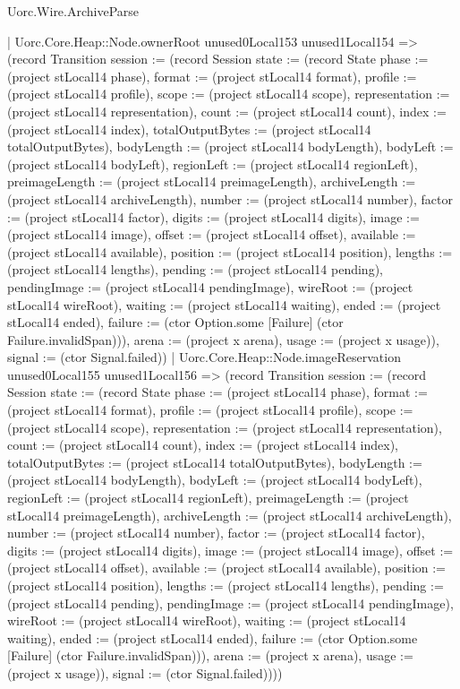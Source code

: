 \begin{lexlean}{Uorc.Wire.ArchiveParse}
\begin{semanticmodule}
{            | Uorc.Core.Heap::Node.ownerRoot unused0Local153 unused1Local154 => (record Transition {session := (record Session {state := (record State {phase := (project stLocal14 phase), format := (project stLocal14 format), profile := (project stLocal14 profile), scope := (project stLocal14 scope), representation := (project stLocal14 representation), count := (project stLocal14 count), index := (project stLocal14 index), totalOutputBytes := (project stLocal14 totalOutputBytes), bodyLength := (project stLocal14 bodyLength), bodyLeft := (project stLocal14 bodyLeft), regionLeft := (project stLocal14 regionLeft), preimageLength := (project stLocal14 preimageLength), archiveLength := (project stLocal14 archiveLength), number := (project stLocal14 number), factor := (project stLocal14 factor), digits := (project stLocal14 digits), image := (project stLocal14 image), offset := (project stLocal14 offset), available := (project stLocal14 available), position := (project stLocal14 position), lengths := (project stLocal14 lengths), pending := (project stLocal14 pending), pendingImage := (project stLocal14 pendingImage), wireRoot := (project stLocal14 wireRoot), waiting := (project stLocal14 waiting), ended := (project stLocal14 ended), failure := (ctor Option.some [Failure] (ctor Failure.invalidSpan))}), arena := (project x arena), usage := (project x usage)}), signal := (ctor Signal.failed)})
            | Uorc.Core.Heap::Node.imageReservation unused0Local155 unused1Local156 => (record Transition {session := (record Session {state := (record State {phase := (project stLocal14 phase), format := (project stLocal14 format), profile := (project stLocal14 profile), scope := (project stLocal14 scope), representation := (project stLocal14 representation), count := (project stLocal14 count), index := (project stLocal14 index), totalOutputBytes := (project stLocal14 totalOutputBytes), bodyLength := (project stLocal14 bodyLength), bodyLeft := (project stLocal14 bodyLeft), regionLeft := (project stLocal14 regionLeft), preimageLength := (project stLocal14 preimageLength), archiveLength := (project stLocal14 archiveLength), number := (project stLocal14 number), factor := (project stLocal14 factor), digits := (project stLocal14 digits), image := (project stLocal14 image), offset := (project stLocal14 offset), available := (project stLocal14 available), position := (project stLocal14 position), lengths := (project stLocal14 lengths), pending := (project stLocal14 pending), pendingImage := (project stLocal14 pendingImage), wireRoot := (project stLocal14 wireRoot), waiting := (project stLocal14 waiting), ended := (project stLocal14 ended), failure := (ctor Option.some [Failure] (ctor Failure.invalidSpan))}), arena := (project x arena), usage := (project x usage)}), signal := (ctor Signal.failed)})))
}
\end{semanticmodule}
\end{lexlean}
